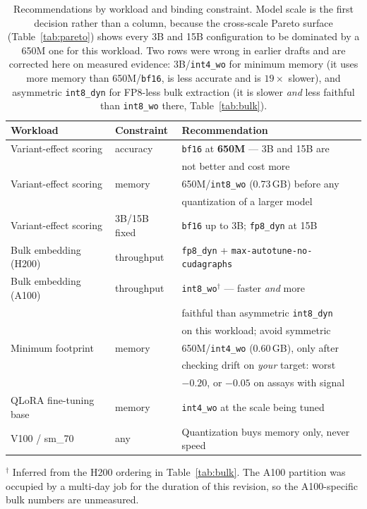 \documentclass[11pt]{article}
\newcommand{\cfg}[1]{\texttt{#1}}
\begin{document}
\begin{table}[htb]
\centering
\caption{Recommendations by workload and binding constraint. Model scale is the
first decision rather than a column, because the cross-scale Pareto surface
(Table~\ref{tab:pareto}) shows every 3B and 15B configuration to be dominated by
a 650M one for this workload. Two rows were wrong in earlier drafts and are
corrected here on measured evidence: 3B/\cfg{int4\_wo} for minimum memory (it
uses more memory than 650M/\cfg{bf16}, is less accurate and is $19\times$
slower), and asymmetric \cfg{int8\_dyn} for FP8-less bulk extraction (it is
slower \emph{and} less faithful than \cfg{int8\_wo} there, Table~\ref{tab:bulk}).}
\label{tab:recs}
\small
\begin{tabular}{lll}
\toprule
Workload & Constraint & Recommendation \\
\midrule
Variant-effect scoring & accuracy   & \cfg{bf16} at \textbf{650M} --- 3B and 15B are \\
                       &            & \quad not better and cost more \\
Variant-effect scoring & memory     & 650M/\cfg{int8\_wo} (0.73\,GB) before any \\
                       &            & \quad quantization of a larger model \\
Variant-effect scoring & 3B/15B fixed & \cfg{bf16} up to 3B; \cfg{fp8\_dyn} at 15B \\
Bulk embedding (H200)  & throughput & \cfg{fp8\_dyn} + \texttt{max-autotune-no-cudagraphs} \\
Bulk embedding (A100)  & throughput & \cfg{int8\_wo}$^\dagger$ --- faster \emph{and} more \\
                       &            & \quad faithful than asymmetric \cfg{int8\_dyn} \\
                       &            & \quad on this workload; avoid symmetric \\
Minimum footprint      & memory     & 650M/\cfg{int4\_wo} (0.60\,GB), only after \\
                       &            & \quad checking drift on \emph{your} target: worst \\
                       &            & \quad $-0.20$, or $-0.05$ on assays with signal \\
QLoRA fine-tuning base & memory     & \cfg{int4\_wo} at the scale being tuned \\
V100 / sm\_70          & any        & Quantization buys memory only, never speed \\
\bottomrule
\end{tabular}

\vspace{3pt}
{\footnotesize $^\dagger$ Inferred from the H200 ordering in
Table~\ref{tab:bulk}. The A100 partition was occupied by a multi-day job
for the duration of this revision, so the A100-specific bulk numbers are
unmeasured.}
\end{table}
\end{document}
